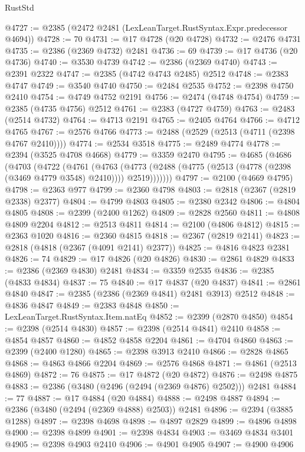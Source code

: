 \begin{lexlean}{RustStd}
\begin{coremodule}
@4727 := @2385 (@2472 @2481 (LexLeanTarget.RustSyntax.Expr.predecessor @4694))
@4728 := 70
@4731 := @17 @4728 (@20 @4728)
@4732 := @2476 @4731
@4735 := @2386 (@2369 @4732) @2481
@4736 := 69
@4739 := @17 @4736 (@20 @4736)
@4740 := @3530 @4739
@4742 := @2386 (@2369 @4740)
@4743 := @2391 @2322
@4747 := @2385 (@4742 @4743 @2485) @2512
@4748 := @2383 @4747
@4749 := @3540 @4740
@4750 := @2484 @2535
@4752 := @2398 @4750 @2410
@4754 := @4749 @4752 @2191
@4756 := @2474 (@4748 @4754)
@4759 := @2385 (@4735 @4756) @2512
@4761 := @2383 (@4727 @4759)
@4763 := @2483 (@2514 @4732)
@4764 := @4713 @2191
@4765 := @2405 @4764
@4766 := @4712 @4765
@4767 := @2576 @4766
@4773 := @2488 (@2529 (@2513 (@4711 (@2398 @4767 @2410))))
@4774 := @2534 @3518
@4775 := @2489 @4774
@4778 := @2394 (@3525 @4708 @4668)
@4779 := @3359 @2470
@4795 := @4685
    (@4686
      (@4703
        (@4722
          (@4761
            (@4763
              (@4773 (@2488 (@4775 (@2513 (@4778 (@2398 (@3469 @4779 @3548) @2410)))) @2519)))))))
@4797 := @2100 (@4669 @4795)
@4798 := @2363 @977
@4799 := @2360 @4798
@4803 := @2818 (@2367 (@2819 @2338) @2377)
@4804 := @4799 @4803
@4805 := @2380 @2342
@4806 := @4804 @4805
@4808 := @2399 (@2400 @1262)
@4809 := @2828 @2560
@4811 := @4808 @4809 @2204
@4812 := @2513 @4811
@4814 := @2100 (@4806 @4812)
@4815 := @2363 @1020
@4816 := @2360 @4815
@4818 := @2367 (@2819 @2141)
@4823 := @2818 (@4818 (@2367 (@4091 @2141) @2377))
@4825 := @4816 @4823 @2381
@4826 := 74
@4829 := @17 @4826 (@20 @4826)
@4830 := @2861 @4829
@4833 := @2386 (@2369 @4830) @2481
@4834 := @3359 @2535
@4836 := @2385 (@4833 @4834)
@4837 := 75
@4840 := @17 @4837 (@20 @4837)
@4841 := @2861 @4840
@4847 := @2385 (@2386 (@2369 @4841) @2481 @3913) @2512
@4848 := @4836 @4847
@4849 := @2383 @4848
@4850 := LexLeanTarget.RustSyntax.Item.natEq
@4852 := @2399 (@2870 @4850)
@4854 := @2398 (@2514 @4830)
@4857 := @2398 (@2514 @4841) @2410
@4858 := @4854 @4857
@4860 := @4852 @4858 @2204
@4861 := @4704 @4860
@4863 := @2399 (@2400 @1280)
@4865 := @2398 @3913 @2410
@4866 := @2828 @4865
@4868 := @4863 @4866 @2204
@4869 := @2576 @4868
@4871 := @4861 (@2513 @4869)
@4872 := 76
@4875 := @17 @4872 (@20 @4872)
@4876 := @2498 @4875
@4883 := @2386 (@3480 (@2496 (@2494 (@2369 @4876) @2502))) @2481
@4884 := 77
@4887 := @17 @4884 (@20 @4884)
@4888 := @2498 @4887
@4894 := @2386 (@3480 (@2494 (@2369 @4888) @2503)) @2481
@4896 := @2394 (@3885 @1288)
@4897 := @2398 @4698
@4898 := @4897 @2829
@4899 := @4896 @4898
@4900 := @2398 @4899
@4901 := @2398 @4834
@4903 := @3469 @4834 @3401
@4905 := @2398 @4903 @2410
@4906 := @4901 @4905
@4907 := @4900 @4906

\end{coremodule}
\end{lexlean}
